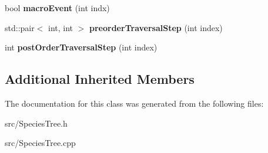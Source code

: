 \begin{DoxyCompactItemize}
\mbox{\label{class_species_tree_ac7fdbcc589a48209f7baeaaf9201e5a7}} 
bool {\bfseries macro\+Event} (int indx)
\item 
\mbox{\label{class_species_tree_a23f69b85d7167c512d6224d1b42d5656}} 
std\+::pair$<$ int, int $>$ {\bfseries preorder\+Traversal\+Step} (int index)
\item 
\mbox{\label{class_species_tree_af5469dd46ef03e8b428ef849b9ba7dd6}} 
int {\bfseries post\+Order\+Traversal\+Step} (int index)
\end{DoxyCompactItemize}
\subsection*{Additional Inherited Members}


The documentation for this class was generated from the following files\+:\begin{DoxyCompactItemize}
\item 
src/Species\+Tree.\+h\item 
src/Species\+Tree.\+cpp\end{DoxyCompactItemize}
